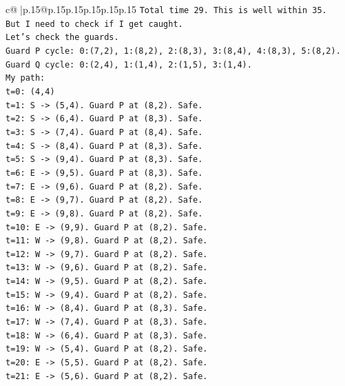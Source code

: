 \documentclass{article}
\begin{document}
{\begin{supertabular}{c@{$\;$}|p{.15\linewidth}@{}p{.15\linewidth}p{.15\linewidth}p{.15\linewidth}p{.15\linewidth}p{.15\linewidth}}
{{{\texttt{Total time 29. This is well within 35.} \\
\texttt{But I need to check if I get caught.} \\
\texttt{Let's check the guards.} \\
\texttt{Guard P cycle: 0:(7,2), 1:(8,2), 2:(8,3), 3:(8,4), 4:(8,3), 5:(8,2).} \\
\texttt{Guard Q cycle: 0:(2,4), 1:(1,4), 2:(1,5), 3:(1,4).} \\
\texttt{My path:} \\
\texttt{t=0: (4,4)} \\
\texttt{t=1: S {-}> (5,4). Guard P at (8,2). Safe.} \\
\texttt{t=2: S {-}> (6,4). Guard P at (8,3). Safe.} \\
\texttt{t=3: S {-}> (7,4). Guard P at (8,4). Safe.} \\
\texttt{t=4: S {-}> (8,4). Guard P at (8,3). Safe.} \\
\texttt{t=5: S {-}> (9,4). Guard P at (8,3). Safe.} \\
\texttt{t=6: E {-}> (9,5). Guard P at (8,3). Safe.} \\
\texttt{t=7: E {-}> (9,6). Guard P at (8,2). Safe.} \\
\texttt{t=8: E {-}> (9,7). Guard P at (8,2). Safe.} \\
\texttt{t=9: E {-}> (9,8). Guard P at (8,2). Safe.} \\
\texttt{t=10: E {-}> (9,9). Guard P at (8,2). Safe.} \\
\texttt{t=11: W {-}> (9,8). Guard P at (8,2). Safe.} \\
\texttt{t=12: W {-}> (9,7). Guard P at (8,2). Safe.} \\
\texttt{t=13: W {-}> (9,6). Guard P at (8,2). Safe.} \\
\texttt{t=14: W {-}> (9,5). Guard P at (8,2). Safe.} \\
\texttt{t=15: W {-}> (9,4). Guard P at (8,2). Safe.} \\
\texttt{t=16: W {-}> (8,4). Guard P at (8,3). Safe.} \\
\texttt{t=17: W {-}> (7,4). Guard P at (8,3). Safe.} \\
\texttt{t=18: W {-}> (6,4). Guard P at (8,3). Safe.} \\
\texttt{t=19: W {-}> (5,4). Guard P at (8,2). Safe.} \\
\texttt{t=20: E {-}> (5,5). Guard P at (8,2). Safe.} \\
\texttt{t=21: E {-}> (5,6). Guard P at (8,2). Safe.} \\
}}}
\end{supertabular}}
\end{document}
